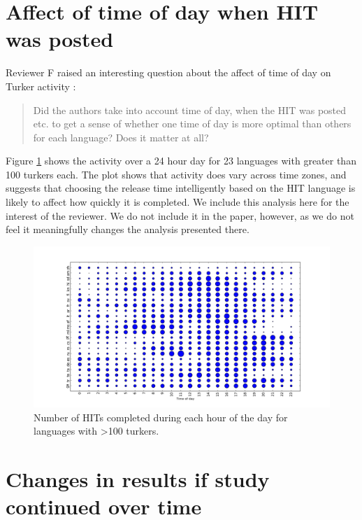 \documentclass[11pt]{article}
\begin{document}
\section{Affect of time of day when HIT was posted}

Reviewer F raised an interesting question about the affect of time of day on Turker activity : 

\begin{quote}
Did the authors take into account time of day, when the HIT was posted etc. to get a sense of whether one time of day is more optimal than others for each language? Does it matter at all?
\end{quote}
Figure \ref{time} shows the activity over a 24 hour day for 23 languages with greater than 100 turkers each. The plot shows that activity does vary across time zones, and suggests that choosing the release time intelligently based on the HIT language is likely to affect how quickly it is completed. We include this analysis here for the interest of the reviewer. We do not include it in the paper, however, as we do not feel it meaningfully changes the analysis presented there. 

\begin{figure}
\centering
\includegraphics[height=.8\linewidth, angle=270]{figures/times.png}
\caption{Number of HITs completed during each hour of the day for languages with \textgreater 100 turkers.}
\label{time}
\end{figure}

\section{Changes in results if study continued over time}
\end{document}
